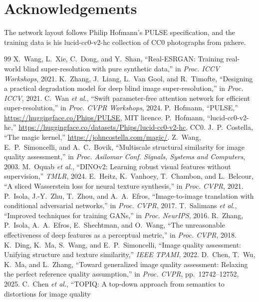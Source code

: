 \documentclass[conference]{IEEEtran}
\begin{document}
\section*{Acknowledgements}
The network layout follows Philip Hofmann's PULSE specification, and the training data is his lucid-cc0-v2-hc
collection of CC0 photographs from pxhere.

\begin{thebibliography}{99}\footnotesize
{} X.~Wang, L.~Xie, C.~Dong, and Y.~Shan, ``Real-ESRGAN: Training real-world blind super-resolution
  with pure synthetic data,'' in \emph{Proc. ICCV Workshops}, 2021.
 K.~Zhang, J.~Liang, L.~Van Gool, and R.~Timofte, ``Designing a practical degradation model for deep
  blind image super-resolution,'' in \emph{Proc. ICCV}, 2021.
 C.~Wan \emph{et al.}, ``Swift parameter-free attention network for efficient super-resolution,'' in
  \emph{Proc. CVPR Workshops}, 2024.
 P.~Hofmann, ``PULSE,'' \url{https://huggingface.co/Phips/PULSE}, MIT licence.
 P.~Hofmann, ``lucid-cc0-v2-hc,'' \url{https://huggingface.co/datasets/Phips/lucid-cc0-v2-hc}, CC0.
 J.~P.~Costella, ``The magic kernel,'' \url{https://johncostella.com/magic/}.
 Z.~Wang, E.~P.~Simoncelli, and A.~C.~Bovik, ``Multiscale structural similarity for image quality
  assessment,'' in \emph{Proc. Asilomar Conf. Signals, Systems and Computers}, 2003.
 M.~Oquab \emph{et al.}, ``DINOv2: Learning robust visual features without supervision,''
  \emph{TMLR}, 2024.
 E.~Heitz, K.~Vanhoey, T.~Chambon, and L.~Belcour, ``A sliced Wasserstein loss for neural texture
  synthesis,'' in \emph{Proc. CVPR}, 2021.
 P.~Isola, J.-Y.~Zhu, T.~Zhou, and A.~A.~Efros, ``Image-to-image translation with conditional
  adversarial networks,'' in \emph{Proc. CVPR}, 2017.
 T.~Salimans \emph{et al.}, ``Improved techniques for training GANs,'' in \emph{Proc. NeurIPS},
  2016.
 R.~Zhang, P.~Isola, A.~A.~Efros, E.~Shechtman, and O.~Wang, ``The unreasonable effectiveness of deep
  features as a perceptual metric,'' in \emph{Proc. CVPR}, 2018.
 K.~Ding, K.~Ma, S.~Wang, and E.~P.~Simoncelli, ``Image quality assessment: Unifying structure and
  texture similarity,'' \emph{IEEE TPAMI}, 2022.
 D.~Chen, T.~Wu, K.~Ma, and L.~Zhang, ``Toward generalized image quality assessment: Relaxing the
  perfect reference quality assumption,'' in \emph{Proc. CVPR}, pp.~12742--12752, 2025.
 C.~Chen \emph{et al.}, ``TOPIQ: A top-down approach from semantics to distortions for image quality

\end{thebibliography}
\end{document}

